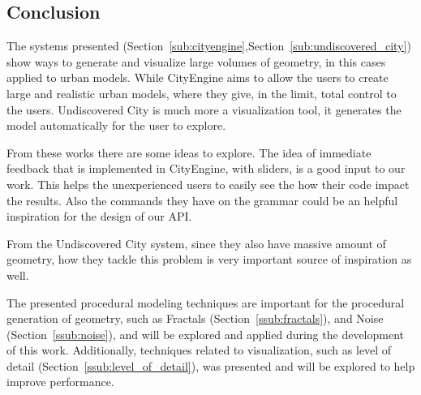 


\subsection{Conclusion} %
\label{sub:conclusion}

The systems presented (Section~\ref{sub:cityengine},Section~\ref{sub:undiscovered_city}) show ways to generate and visualize large volumes of geometry, in this cases applied to urban models. While CityEngine \cite{Parish2001} aims to allow the users to create large and realistic urban models, where they give, in the limit, total control to the users. Undiscovered City\cite{Greuter2003} is much more a visualization tool, it generates the model automatically for the user to explore.

From these works there are some ideas to explore. The idea of immediate feedback that is implemented in CityEngine, with sliders, is a good input to our work. This helps the unexperienced users to easily see the how their code impact the results. Also the commands they have on the grammar could be an helpful inspiration for the design of our API.

From the Undiscovered City system, since they also have massive amount of geometry, how they tackle this problem is very important source of inspiration as well.

The presented procedural modeling techniques are important for the procedural generation of geometry, such as Fractals (Section~\ref{ssub:fractals}), and Noise (Section~\ref{ssub:noise}), and will be explored and applied during the development of this work. Additionally, techniques related to visualization, such as level of detail (Section~\ref{ssub:level_of_detail}), was presented and will be explored to help improve performance.





%
%
%
%






